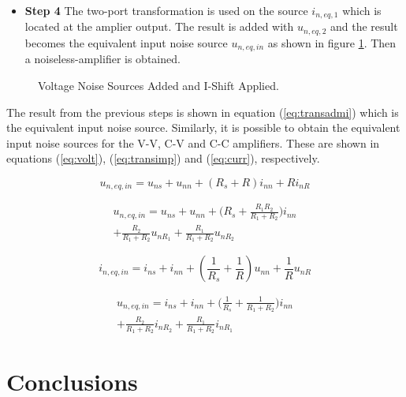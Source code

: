 \documentclass[letterpaper]{ecctd01}
\begin{document}
\begin{itemize}
\item {\bf Step 4} The two-port transformation is used on the source $i_{n,eq,1}$ which is located at the amplier output. The result is added with $u_{n,eq,2}$ and the result becomes the equivalent input noise source $u_{n,eq,in}$ as shown in figure \ref{trans4}. Then a noiseless-amplifier is obtained.
\end{itemize}

\begin{figure}[hbtp]
\centerline{
\epsfxsize=50mm
}
\caption{Voltage Noise Sources Added and I-Shift Applied.}
\label{trans4}
\end{figure} 

The result from the previous steps is shown in equation (\ref{eq:transadmi}) which is the equivalent input noise source. Similarly, it is possible to obtain the equivalent input noise sources for the V-V, C-V and C-C amplifiers. These are shown in equations (\ref{eq:volt}), (\ref{eq:transimp}) and (\ref{eq:curr}), respectively.

\begin{equation}\label{eq:transadmi}
u_{n,eq,in}=u_{ns}+u_{nn}+(R_s+R)i_{nn}+Ri_{nR}
\end{equation}

\begin{equation}\label{eq:volt}
\begin{split}
u_{n,eq,in}=u_{ns}+u_{nn}+\bigg(R_s+\frac{R_1R_2}{R_1+R_2}\bigg)i_{nn}\\
+\frac{R_2}{R_1+R_2}u_{nR_1}+\frac{R_1}{R_1+R_2}u_{nR_2}
\end{split}
\end{equation}

\begin{equation}\label{eq:transimp}
i_{n,eq,in}=i_{ns}+i_{nn}+(\frac{1}{R_s}+\frac{1}{R})u_{nn}+\frac{1}{R}u_{nR}
\end{equation}

\begin{equation}\label{eq:curr}
\begin{split}
u_{n,eq,in}=i_{ns}+i_{nn}+\bigg(\frac{1}{R_s}+\frac{1}{R_1+R_2}\bigg)i_{nn}\\
+\frac{R_2}{R_1+R_2}i_{nR_2}+\frac{R_1}{R_1+R_2}i_{nR_1}
\end{split}
\end{equation}

\section{Conclusions}
\end{document}
